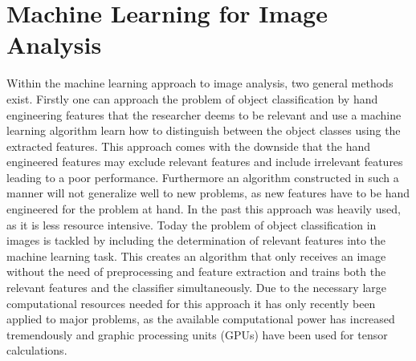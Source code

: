 
\chapter{Machine Learning for Image Analysis} %

\label{CNN} %

Within the machine learning approach to image analysis, two general methods exist. Firstly one can approach the problem of object classification by hand engineering features that the researcher deems to be relevant and use a machine learning algorithm learn how to distinguish between the object classes using the extracted features. This approach comes with the downside that the hand engineered features may exclude relevant features and include irrelevant features leading to a poor performance. Furthermore an algorithm constructed in such a manner will not generalize well to new problems, as new features have to be hand engineered for the problem at hand. In the past this approach was heavily used, as it is less resource intensive. Today the problem of object classification in images is tackled by including the determination of relevant features into the machine learning task. This creates an algorithm that only receives an image without the need of preprocessing and feature extraction and trains both the relevant features and the classifier simultaneously. Due to the necessary large computational resources needed for this approach it has only recently been applied to major problems, as the available computational power has increased tremendously and graphic processing units (GPUs) have been used for tensor calculations.


